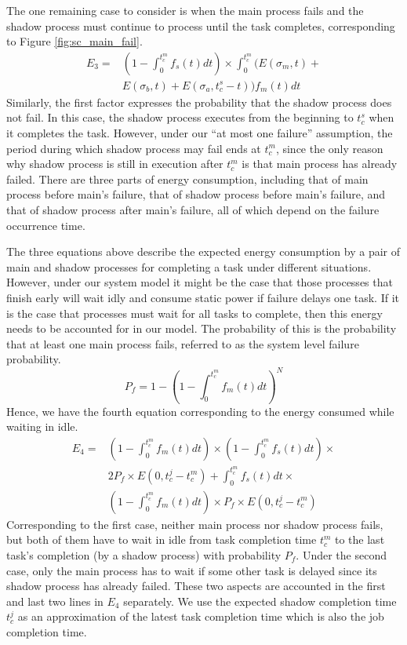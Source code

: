 The one remaining case to consider is when the main process fails and
the shadow process must continue to process until the task completes,
corresponding to Figure \ref{fig:sc_main_fail}.
\begin{equation}
\begin{split}
E_3 = & (1-\int_0^{t_c^m}f_s(t)dt) \times \int_0^{t_c^m}(E(\sigma_m,t)+\\
      & E(\sigma_b,t)+E(\sigma_a,t_c^s-t))f_m(t)dt
\label{eq:energy_main_fail}
\end{split}
\end{equation}
Similarly, the first factor expresses the probability that the shadow process does
not fail. In this case, the shadow process executes from the beginning to
$t_c^s$ when it completes the task. However, under our ``at most one
failure'' assumption, the period during which shadow process may fail
ends at $t_c^m$, since the only reason why shadow process is still in
execution after $t_c^m$ is that main process has already failed. There
are three parts of energy consumption, including that of main process
before main's failure, that of shadow process before main's failure,
and that of shadow process after main's failure, all of which depend
on the failure occurrence time. 

The three equations above describe the expected energy consumption by a
pair of main and shadow processes for completing a task under
different situations. However, under our system model it might be the
case that those processes that finish early will wait idly and
consume static power if failure delays one task. If it is the case
that processes must wait for all tasks to complete, then this energy
needs to be accounted for in our model. The probability of this is the probability that at least one main process fails,
referred to as the system level failure probability.
\begin{equation}
P_f=1-(1-\int_0^{t_c^m}f_m(t)dt)^N
\label{eq:prob_of_one_main_failure}
\end{equation}
Hence, we have the fourth equation corresponding to the energy consumed while waiting in idle. 
\begin{equation}
  \begin{split}
  E_4 = & ( 1-\int_0^{t_c^m}f_m(t)dt) \times (1 - \int_0^{t_c^m} f_s(t)dt) \times \\
        & 2 P_f \times E(0,t_c^j-t_c^m) + \int_0^{t_c^m}f_s(t)dt \times \\
        & (1-\int_0^{t_c^m}f_m(t)dt) \times P_f \times E(0,t_c^j-t_c^m) 
  \end{split}
\end{equation}
Corresponding to the first case, neither main process nor shadow
process fails, but both of them have to wait in idle from task
completion time $t_c^m$ to the last task's completion (by a shadow
process) with probability $P_f$. Under the second case, only the main
process has to wait if some other task is delayed since its shadow
process has already failed. These two aspects are accounted in the
first and last two lines in $E_4$ separately.  We use the expected
shadow completion time $t_c^j$ as an approximation of the latest task
completion time which is also the job completion time.

